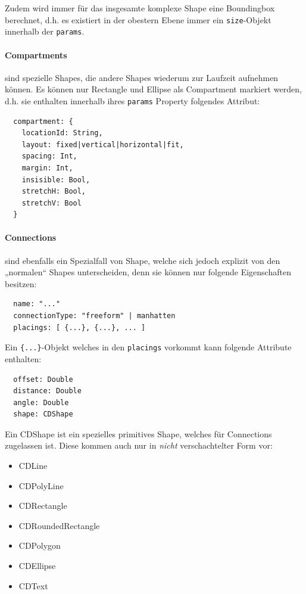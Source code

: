 \noindent Zudem wird immer für das insgesamte komplexe Shape eine Boundingbox berechnet,
d.h. es existiert in der obestern Ebene immer ein {\tt size}-Objekt innerhalb
der {\tt params}.

\paragraph{Compartments} sind spezielle Shapes, die andere Shapes wiederum
zur Laufzeit aufnehmen können. Es können nur Rectangle und Ellipse als
Compartment markiert werden, d.h. sie enthalten innerhalb ihres {\tt params}
Property folgendes Attribut:

\begin{verbatim}
  compartment: {
    locationId: String,
    layout: fixed|vertical|horizontal|fit,
    spacing: Int,
    margin: Int,
    insisible: Bool,
    stretchH: Bool,
    stretchV: Bool
  }
\end{verbatim}

\paragraph{Connections} sind ebenfalls ein Spezialfall von Shape,
welche sich jedoch explizit von den „normalen“ Shapes unterscheiden,
denn sie können nur folgende Eigenschaften besitzen:

\begin{verbatim}
  name: "..."
  connectionType: "freeform" | manhatten
  placings: [ {...}, {...}, ... ]
\end{verbatim}

\noindent Ein \verb|{...}|-Objekt welches in den {\tt placings} vorkommt kann folgende
Attribute enthalten:

\begin{verbatim}
  offset: Double
  distance: Double
  angle: Double
  shape: CDShape
\end{verbatim}

\noindent Ein CDShape ist ein spezielles primitives Shape, welches für Connections
zugelassen ist. Diese kommen auch nur in \emph{nicht} verschachtelter Form vor:

\begin{itemize}
  \item CDLine
  \item CDPolyLine
  \item CDRectangle
  \item CDRoundedRectangle
  \item CDPolygon
  \item CDEllipse
  \item CDText
\end{itemize}


